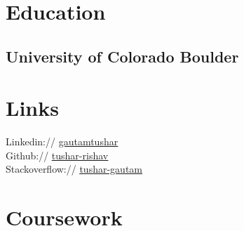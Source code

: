 \documentclass[]{deedy-resume-openfont}
\begin{document}
%
%
\lastupdated

%
%
%
%

\begin{minipage}[t]{0.33\textwidth} 

\sectionsep
\section{Education} 

\subsection{University of Colorado Boulder}
\sectionsep


\section{Links} 
\textbullet{} Linkedin:// \href{https://www.linkedin.com/in/gautamtushar}{\underline {gautamtushar}} \\
\textbullet{} Github:// \href{https://github.com/tushar-rishav}{\underline {tushar-rishav}} \\
\textbullet{} Stackoverflow:// \href{https://stackoverflow.com/users/3673031/tushar-gautam}{\underline {tushar-gautam}}
\sectionsep


\section{Coursework}

\end{minipage}
\end{document}
